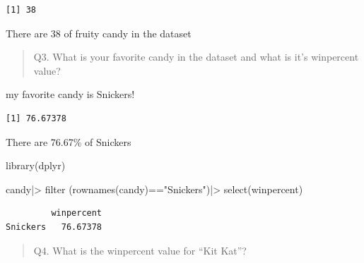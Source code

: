 \documentclass[
  letterpaper,
  DIV=11,
  numbers=noendperiod]{scrartcl}
\newenvironment{Shaded}{\begin{snugshade}}{\end{snugshade}}
\newcommand{\DecValTok}[1]{\textcolor[rgb]{0.68,0.00,0.00}{#1}}
\newcommand{\FunctionTok}[1]{\textcolor[rgb]{0.28,0.35,0.67}{#1}}
\newcommand{\NormalTok}[1]{\textcolor[rgb]{0.00,0.23,0.31}{#1}}
\newcommand{\SpecialCharTok}[1]{\textcolor[rgb]{0.37,0.37,0.37}{#1}}
\newcommand{\StringTok}[1]{\textcolor[rgb]{0.13,0.47,0.30}{#1}}
\begin{document}
\begin{Shaded}
\end{Shaded}

\begin{verbatim}
[1] 38
\end{verbatim}

There are 38 of fruity candy in the dataset

\begin{quote}
Q3. What is your favorite candy in the dataset and what is it's
winpercent value?
\end{quote}

my favorite candy is Snickers!

\begin{Shaded}
\end{Shaded}

\begin{verbatim}
[1] 76.67378
\end{verbatim}

There are 76.67\% of Snickers

\begin{Shaded}
\begin{Highlighting}[]
\FunctionTok{library}\NormalTok{(dplyr)}

\NormalTok{candy}\SpecialCharTok{|\textgreater{}} \FunctionTok{filter}\NormalTok{ (}\FunctionTok{rownames}\NormalTok{(candy)}\SpecialCharTok{==}\StringTok{"Snickers"}\NormalTok{)}\SpecialCharTok{|\textgreater{}}
  \FunctionTok{select}\NormalTok{(winpercent)}
\end{Highlighting}
\end{Shaded}

\begin{verbatim}
         winpercent
Snickers   76.67378
\end{verbatim}

\begin{quote}
Q4. What is the winpercent value for ``Kit Kat''?
\end{quote}

\begin{Shaded}
\end{Shaded}
\end{document}
